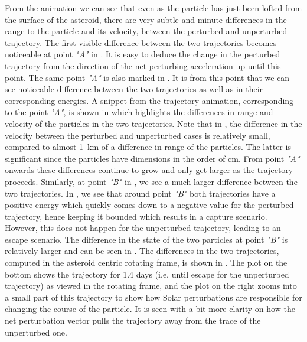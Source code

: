\FloatBarrier
From the animation we can see that even as the particle has just been lofted from the surface of the asteroid, there are very subtle and minute differences in the range to the particle and its velocity, between the perturbed and unperturbed trajectory. The first visible difference between the two trajectories becomes noticeable at point \textit{"A"} in . It is easy to deduce the change in the perturbed trajectory from the direction of the net perturbing acceleration up until this point. The same point \textit{"A"} is also marked in . It is from this point that we can see noticeable difference between the two trajectories as well as in their corresponding energies. A snippet from the trajectory animation, corresponding to the point \textit{"A"}, is shown in  which highlights the differences in range and velocity of the particles in the two trajectories. Note that in , the difference in the velocity between the perturbed and unperturbed cases is relatively small, compared to almost \SI{1}{\kilo\metre} of a difference in range of the particles. The latter is significant since the particles have dimensions in the order of \si{\centi\metre}. From point \textit{"A"} onwards these differences continue to grow and only get larger as the trajectory proceeds.
%
\newline\newline
%
Similarly, at point \textit{"B"} in , we see a much larger difference between the two trajectories. In , we see that around point \textit{"B"} both trajectories have a positive energy which quickly comes down to a negative value for the perturbed trajectory, hence keeping it bounded which results in a capture scenario. However, this does not happen for the unperturbed trajectory, leading to an escape scenario. The difference in the state of the two particles at point \textit{"B"} is relatively larger and can be seen in . The differences in the two trajectories, computed in the asteroid centric rotating frame, is shown in . The plot on the bottom shows the trajectory for 1.4 days (i.e. until escape for the unperturbed trajectory) as viewed in the rotating frame, and the plot on the right zooms into a small part of this trajectory to show how Solar perturbations are responsible for changing the course of the particle. It is seen with a bit more clarity on how the net perturbation vector pulls the trajectory away from the trace of the unperturbed one.

